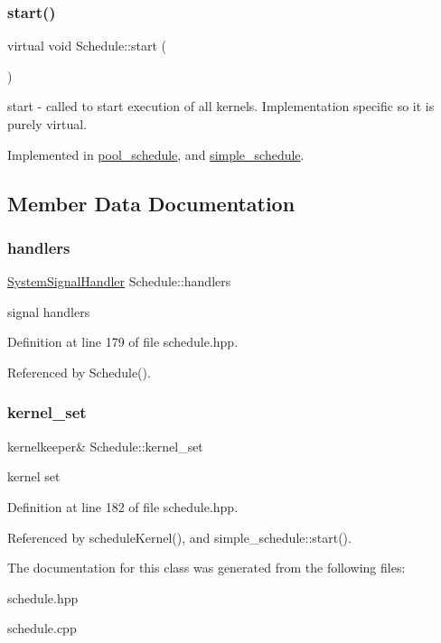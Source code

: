 \subsubsection{\texorpdfstring{start()}{start()}}
{\footnotesize\ttfamily virtual void Schedule\+::start (\begin{DoxyParamCaption}{ }\end{DoxyParamCaption})\hspace{0.3cm}{\ttfamily [pure virtual]}}

start -\/ called to start execution of all kernels. Implementation specific so it is purely virtual. 

Implemented in \hyperlink{classpool__schedule_a9dd6194fd47fd0b12d2b62dcc57e38c2}{pool\+\_\+schedule}, and \hyperlink{classsimple__schedule_ad60a7608111e011d0c04f6ac566cfd8c}{simple\+\_\+schedule}.



\subsection{Member Data Documentation}
\hypertarget{class_schedule_ad248e99611a87776fb411836cd46a603}{}\label{class_schedule_ad248e99611a87776fb411836cd46a603} 
\subsubsection{\texorpdfstring{handlers}{handlers}}
{\footnotesize\ttfamily \hyperlink{class_system_signal_handler}{System\+Signal\+Handler} Schedule\+::handlers\hspace{0.3cm}{\ttfamily [protected]}}

signal handlers 

Definition at line 179 of file schedule.\+hpp.



Referenced by Schedule().

\hypertarget{class_schedule_a1a448b0d48e656f94db65a70cedd8eed}{}\label{class_schedule_a1a448b0d48e656f94db65a70cedd8eed} 
\subsubsection{\texorpdfstring{kernel\+\_\+set}{kernel\_set}}
{\footnotesize\ttfamily kernelkeeper\& Schedule\+::kernel\+\_\+set\hspace{0.3cm}{\ttfamily [protected]}}

kernel set 

Definition at line 182 of file schedule.\+hpp.



Referenced by schedule\+Kernel(), and simple\+\_\+schedule\+::start().



The documentation for this class was generated from the following files\+:\begin{DoxyCompactItemize}
\item 
schedule.\+hpp\item 
schedule.\+cpp\end{DoxyCompactItemize}
